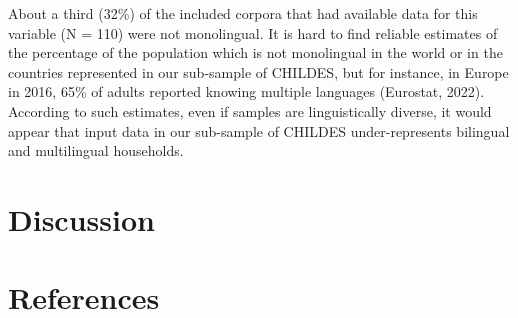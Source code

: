 \documentclass[
  man,floatsintext]{apa6}
\begin{document}
About a third (32\%) of the included corpora that had available data for this variable (N = 110) were not monolingual. It is hard to find reliable estimates of the percentage of the population which is not monolingual in the world or in the countries represented in our sub-sample of CHILDES, but for instance, in Europe in 2016, 65\% of adults reported knowing multiple languages (Eurostat, 2022). According to such estimates, even if samples are linguistically diverse, it would appear that input data in our sub-sample of CHILDES under-represents bilingual and multilingual households.

\hypertarget{discussion}{%
\section{Discussion}\label{discussion}}

\newpage

\hypertarget{references}{%
\section*{References}\label{references}}
\end{document}
